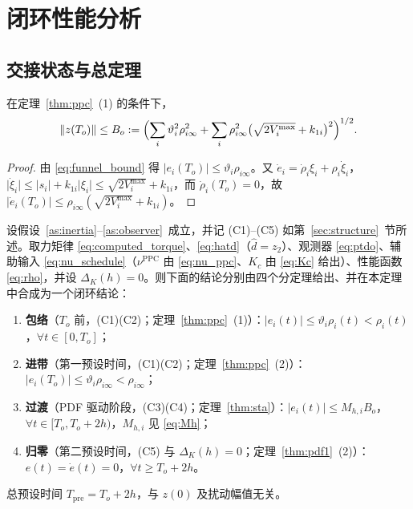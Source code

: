 \section{闭环性能分析}
\label{sec:analysis}

\subsection{交接状态与总定理}
\label{sec:main}

\begin{lemma}[交接状态有界]\label{lem:handover}
在定理~\ref{thm:ppc}~(1) 的条件下，
\begin{equation}
\lVert z(T_o)\rVert\le B_o:=\Bigl(\sum_{i}\vartheta_i^2\rho_{i\infty}^{2}
+\sum_{i}\rho_{i\infty}^{2}\bigl(\sqrt{2V_i^{\max}}+k_{1i}\bigr)^{2}\Bigr)^{1/2}.
\label{eq:B_o}
\end{equation}
\end{lemma}

\begin{proof}
由 \eqref{eq:funnel_bound} 得 \(\lvert e_i(T_o)\rvert\le\vartheta_i\rho_{i\infty}\)。又 \(\dot e_i=\dot\rho_i\xi_i+\rho_i\dot\xi_i\)，\(\lvert\dot\xi_i\rvert\le\lvert s_i\rvert+k_{1i}\lvert\xi_i\rvert\le\sqrt{2V_i^{\max}}+k_{1i}\)，而 \(\dot\rho_i(T_o)=0\)，故 \(\lvert\dot e_i(T_o)\rvert\le\rho_{i\infty}(\sqrt{2V_i^{\max}}+k_{1i})\)。
\end{proof}

\begin{theorem}\label{thm:main}\label{thm:algo}
设假设~\ref{as:inertia}--\ref{as:observer}~成立，并记 \textup{(C1)}--\textup{(C5)} 如第~\ref{sec:structure}~节所述。取力矩律 \eqref{eq:computed_torque}、\eqref{eq:hatd}（\(\hat d=z_2\)）、观测器 \eqref{eq:ptdo}、辅助输入 \eqref{eq:nu_schedule}（\(\nu^{\mathrm{PPC}}\) 由 \eqref{eq:nu_ppc}、\(K_c\) 由 \eqref{eq:Kc} 给出）、性能函数 \eqref{eq:rho}，并设 \(\Delta_K(h)=0\)。则下面的结论分别由四个分定理给出、并在本定理中合成为一个闭环结论：
\begin{enumerate}
  \item[(i)] \textbf{包络}（\(T_o\) 前，\textup{(C1)(C2)}；定理~\ref{thm:ppc}~(1)）：\(\lvert e_i(t)\rvert\le\vartheta_i\rho_i(t)<\rho_i(t)\)，\(\forall t\in[0,T_o]\)；
  \item[(ii)] \textbf{进带}（第一预设时间，\textup{(C1)(C2)}；定理~\ref{thm:ppc}~(2)）：\(\lvert e_i(T_o)\rvert\le\vartheta_i\rho_{i\infty}<\rho_{i\infty}\)；
  \item[(iii)] \textbf{过渡}（PDF 驱动阶段，\textup{(C3)(C4)}；定理~\ref{thm:sta}）：\(\lvert e_i(t)\rvert\le M_{h,i}B_o\)，\(\forall t\in[T_o,T_o+2h)\)，\(M_{h,i}\) 见 \eqref{eq:Mh}；
  \item[(iv)] \textbf{归零}（第二预设时间，\textup{(C5)} 与 \(\Delta_K(h)=0\)；定理~\ref{thm:pdf1}~(2)）：\(e(t)=\dot e(t)=0\)，\(\forall t\ge T_o+2h\)。
\end{enumerate}
总预设时间 \(T_{\mathrm{pre}}=T_o+2h\)，与 \(z(0)\) 及扰动幅值无关。
\end{theorem}

